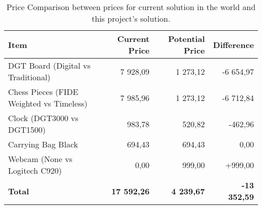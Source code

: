 \begin{table}[h!]
\centering
\caption{Price Comparison between prices for current solution in the world and this project's solution.}
\label{tab:price-comparison}
    \begin{tabular}{lrrr}
        \toprule
        \textbf{Item} & \textbf{Current Price} & \textbf{Potential Price} & \textbf{Difference} \\
        \midrule
        DGT Board (Digital vs Traditional) & 7 928,09 & 1 273,12 & -6 654,97 \\
        Chess Pieces (FIDE Weighted vs Timeless) & 7 985,96 & 1 273,12 & -6 712,84 \\
        Clock (DGT3000 vs DGT1500) & 983,78 & 520,82 & -462,96 \\
        Carrying Bag Black & 694,43 & 694,43 & 0,00 \\
        Webcam (None vs Logitech C920) & 0,00 & 999,00 & +999,00 \\
        \midrule
         \textbf{Total} & \textbf{17 592,26} & \textbf{4 239,67} & \textbf{-13 352,59} \\
        \bottomrule
    \end{tabular}
\end{table}





